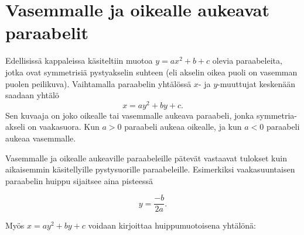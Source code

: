 \section{Vasemmalle ja oikealle aukeavat paraabelit}



Edellisissä kappaleissa käsiteltiin muotoa $y = ax^2 + b + c$ olevia paraabeleita, jotka ovat symmetrisiä pystyakselin suhteen (eli akselin oikea puoli on vasemman puolen peilikuva). Vaihtamalla paraabelin yhtälössä $x$- ja $y$-muuttujat keskenään saadaan yhtälö
\[x=ay^2+by+c.\]
Sen kuvaaja on joko oikealle tai vasemmalle aukeava paraabeli, jonka symmetria-akseli on vaakasuora. Kun $a>0$ paraabeli aukeaa oikealle, ja kun $a < 0$ paraabeli aukeaa vasemmalle.





Vasemmalle ja oikealle aukeaville paraabeleille pätevät vastaavat tulokset kuin aikaisemmin käsitellyille pystysuorille paraabeleille. Esimerkiksi vaakasuuntaisen paraabelin huippu sijaitsee aina pisteessä

\[y = \frac{-b}{2a}.\]


Myös $x=ay^2+by+c$ voidaan kirjoittaa huippumuotoisena yhtälönä:





